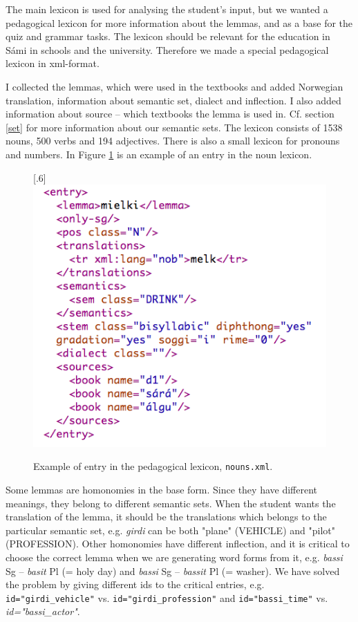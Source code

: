 \documentclass[a4paper,12pt]{article}
\begin{document}
The main lexicon is used for analysing the student's input, but we wanted a pedagogical lexicon for more information about the lemmas, and as a base for the quiz and grammar tasks. The lexicon should be relevant for the education in Sámi in schools and the university. Therefore we made a special pedagogical lexicon in xml-format. 

I collected the lemmas, which were used in the textbooks and added Norwegian translation, information about semantic set, dialect and inflection. I also added information about source -- which textbooks the lemma is used in. Cf. section \ref{set} for more information about our semantic sets. The lexicon consists of 1538 nouns, 500 verbs and 194 adjectives. There is also a small lexicon for pronouns and numbers. In Figure \ref{nounlex} is an example of an entry in the noun lexicon. \\


\begin{figure}[htbp]
\begin{center}
\scalebox{.6}[.6]{\includegraphics{presentation/img/nounlexicon.png}}\\
\caption{Example of entry in the pedagogical lexicon, \texttt{nouns.xml}.}
\label{nounlex}
\end{center}
\end{figure}

Some lemmas are homonomies in the base form. Since they have different meanings, they belong to different semantic sets. When the student wants the translation of the lemma, it should be the translations which belongs to the particular semantic set, e.g. \textit{girdi} can be both "plane" (VEHICLE) and "pilot" (PROFESSION). Other homonomies have different inflection, and it is critical to choose the correct lemma when we are generating word forms from it, e.g. \textit{bassi} Sg -- \textit{basit} Pl (= holy day) and \textit{bassi} Sg -- \textit{bassit} Pl (= washer). We have solved the problem by giving different ids to the critical entries, e.g. \texttt{id="girdi\_vehicle"} vs. 
\texttt{id="girdi\_profession"} and \texttt{id="bassi\_time"} vs. \textit{id="bassi\_actor"}.
\end{document}
